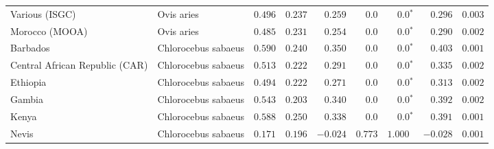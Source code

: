 \begin{center}
\begin{adjustbox}{width = 1\textwidth}
\begin{tabular}{|l|l|r|r|r|r|r|r|r|}
                 Various (ISGC) &           Ovis aries &                                        $ 0.496$ &                                           $ 0.237$ &                      $ 0.259$ &            $0.0$ &                  $\bm{0.0{^*}}$ &                                           $ 0.296$ &           $ 0.003$ \\
                 Morocco (MOOA) &           Ovis aries &                                        $ 0.485$ &                                           $ 0.231$ &                      $ 0.254$ &            $0.0$ &                  $\bm{0.0{^*}}$ &                                           $ 0.290$ &           $ 0.002$ \\
                       Barbados &  Chlorocebus sabaeus &                                        $ 0.590$ &                                           $ 0.240$ &                      $ 0.350$ &            $0.0$ &                  $\bm{0.0{^*}}$ &                                           $ 0.403$ &           $ 0.001$ \\
 Central African Republic (CAR) &  Chlorocebus sabaeus &                                        $ 0.513$ &                                           $ 0.222$ &                      $ 0.291$ &            $0.0$ &                  $\bm{0.0{^*}}$ &                                           $ 0.335$ &           $ 0.002$ \\
                       Ethiopia &  Chlorocebus sabaeus &                                        $ 0.494$ &                                           $ 0.222$ &                      $ 0.271$ &            $0.0$ &                  $\bm{0.0{^*}}$ &                                           $ 0.313$ &           $ 0.002$ \\
                         Gambia &  Chlorocebus sabaeus &                                        $ 0.543$ &                                           $ 0.203$ &                      $ 0.340$ &            $0.0$ &                  $\bm{0.0{^*}}$ &                                           $ 0.392$ &           $ 0.002$ \\
                          Kenya &  Chlorocebus sabaeus &                                        $ 0.588$ &                                           $ 0.250$ &                      $ 0.338$ &            $0.0$ &                  $\bm{0.0{^*}}$ &                                           $ 0.391$ &           $ 0.001$ \\
                          Nevis &  Chlorocebus sabaeus &                                        $ 0.171$ &                                           $ 0.196$ &                      $-0.024$ &         $ 0.773$ &                      $ 1.000~~$ &                                           $-0.028$ &           $ 0.001$ \\

\end{tabular}
\end{adjustbox}
\end{center}
